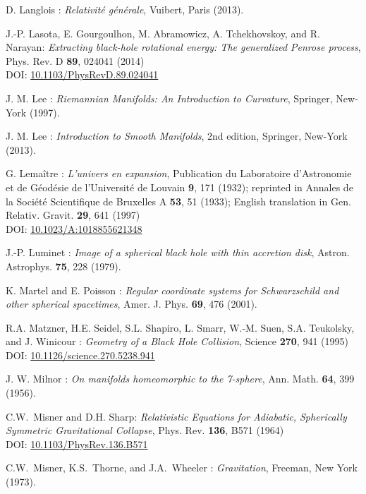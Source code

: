 \begin{thebibliography}{123}
D. Langlois : \emph{Relativit\'e g\'en\'erale},
Vuibert, Paris (2013).

J.-P. Lasota, E. Gourgoulhon, M. Abramowicz, A. Tchekhovskoy,
and R. Narayan:
{\em Extracting black-hole rotational energy: The generalized Penrose process},
Phys. Rev. D {\bf 89}, 024041 (2014)  \\
DOI: \href{https://doi.org/10.1103/PhysRevD.89.024041}{10.1103/PhysRevD.89.024041}

J. M. Lee : {\em Riemannian Manifolds: An Introduction to Curvature},
Springer, New-York (1997).

J. M. Lee : {\em Introduction to Smooth Manifolds}, 2nd edition,
Springer, New-York (2013).

G. Lemaître : {\em L'univers en expansion},
Publication du Laboratoire d'Astronomie et de Géodésie de l'Université
de Louvain {\bf 9},  171 (1932); reprinted in
Annales de la Société Scientifique de Bruxelles A {\bf 53}, 51 (1933);
English translation in
Gen. Relativ. Gravit. {\bf 29}, 641 (1997)\\
DOI: \href{https://doi.org/10.1023/A:1018855621348}{10.1023/A:1018855621348}

J.-P. Luminet : {\em Image of a spherical black hole with thin accretion disk},
Astron. Astrophys. {\bf 75}, 228 (1979).

K. Martel and E. Poisson :
\emph{Regular coordinate systems for Schwarzschild and other spherical spacetimes},
Amer. J. Phys. {\bf 69}, 476 (2001).

R.A. Matzner, H.E. Seidel, S.L. Shapiro, L. Smarr, W.-M. Suen, S.A. Teukolsky, and
J. Winicour : {\em Geometry of a Black Hole Collision},
Science {\bf 270}, 941 (1995)\\
DOI: \href{https://doi.org/10.1126/science.270.5238.941}{10.1126/science.270.5238.941}

J. W. Milnor : {\em On manifolds homeomorphic to the 7-sphere},
Ann. Math. {\bf 64}, 399 (1956).

C.W.~Misner and D.H. Sharp:
{\em Relativistic Equations for Adiabatic, Spherically Symmetric Gravitational Collapse},
Phys. Rev. {\bf 136}, B571 (1964)\\
DOI: \href{https://doi.org/10.1103/PhysRev.136.B571}{10.1103/PhysRev.136.B571}

C.W.~Misner, K.S.~Thorne, and J.A.~Wheeler : {\em Gravitation},
Freeman, New York (1973).


\end{thebibliography}
